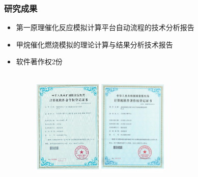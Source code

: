 \documentclass[cjk,slidestop,compress,mathserif,blue]{beamer}
\begin{document}
\frame
{
	\frametitle{研究成果}
	\begin{itemize}
		\item 第一原理催化反应模拟计算平台自动流程的技术分析报告
		\item 甲烷催化燃烧模拟的理论计算与结果分析技术报告
		\item 软件著作权2份\\
			\vskip 3pt
			\fontsize{7.5pt}{4.2pt}\\
			\vskip 5pt
			\fontsize{7.5pt}{4.2pt}
\begin{figure}[h!]
\centering
\vskip -5pt
\includegraphics[height=1.82in]{Figures/Certificate-1.png}
\hskip 5pt
\includegraphics[height=1.82in]{Figures/Certificate-2.jpg}
\label{Certificates}
\end{figure}
	\end{itemize}
}
\end{document}
